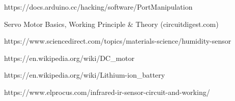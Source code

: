 \documentclass[conference]{IEEEtran}
\begin{document}
\begin{thebibliography}{00}


 https://docs.arduino.cc/hacking/software/PortManipulation

Servo Motor Basics, Working Principle & Theory (circuitdigest.com)

 https://www.sciencedirect.com/topics/materials-science/humidity-sensor


https://en.wikipedia.org/wiki/DC_motor
  
     https://en.wikipedia.org/wiki/Lithium-ion_battery
 
     https://www.elprocus.com/infrared-ir-sensor-circuit-and-working/

\end{thebibliography}
\end{document}
